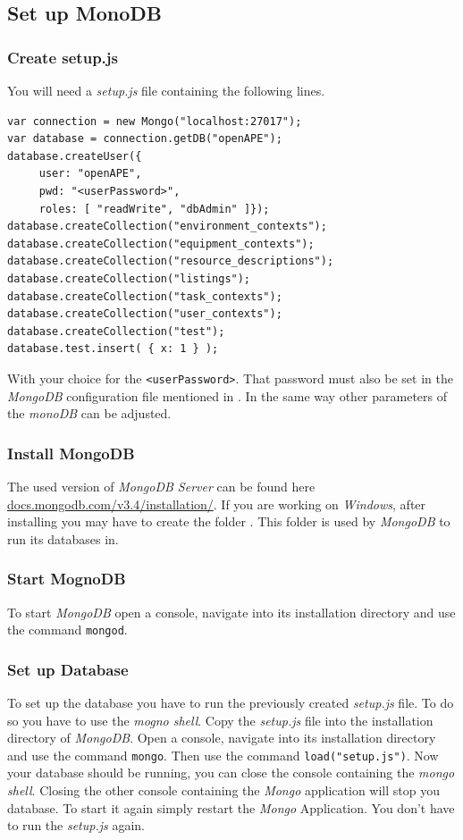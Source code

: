 \documentclass[10pt]{article}
\begin{document}
\subsection{Set up MonoDB}
\subsubsection{Create setup.js} You will need a \emph{setup.js} file containing the following lines.
\begin{lstlisting}
var connection = new Mongo("localhost:27017");
var database = connection.getDB("openAPE");
database.createUser({
     user: "openAPE",
     pwd: "<userPassword>",
     roles: [ "readWrite", "dbAdmin" ]});
database.createCollection("environment_contexts");
database.createCollection("equipment_contexts");
database.createCollection("resource_descriptions");
database.createCollection("listings");
database.createCollection("task_contexts");
database.createCollection("user_contexts");
database.createCollection("test");
database.test.insert( { x: 1 } );
\end{lstlisting}
With your choice for the \texttt{<userPassword>}. That password must also be set in the \emph{MongoDB} configuration file mentioned in . In the same way other parameters of the \emph{monoDB} can be adjusted.
\subsubsection{Install MongoDB} The used version of \emph{MongoDB Server} can be found here \href{https://docs.mongodb.com/v3.4/installation/}{docs.mongodb.com/v3.4/installation/}. If you are working on \emph{Windows}, after installing you may have to create the folder . This folder is used by \emph{MongoDB} to run its databases in.
\subsubsection{Start MognoDB} To start \emph{MongoDB} open a console, navigate into its installation directory and use the command \texttt{mongod}.
\subsubsection{Set up Database} To set up the database you have to run the previously created \emph{setup.js} file. To do so you have to use the \emph{mogno shell}. Copy the \emph{setup.js} file into the installation directory of \emph{MongoDB}. Open a console, navigate into its installation directory and use the command \texttt{mongo}. Then use the command \texttt{load("setup.js")}. Now your database should be running, you can close the console containing the \emph{mongo shell}. Closing the other console containing the \emph{Mongo} application will stop you database. To start it again simply restart the \emph{Mongo} Application. You don't have to run the \emph{setup.js} again.
\end{document}
